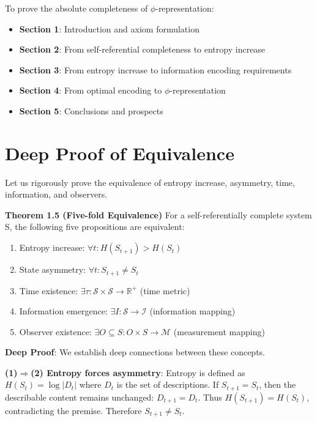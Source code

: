 To prove the absolute completeness of $\phi$-representation:

\begin{itemize}
\item \textbf{Section 1}: Introduction and axiom formulation
\item \textbf{Section 2}: From self-referential completeness to entropy increase
\item \textbf{Section 3}: From entropy increase to information encoding requirements
\item \textbf{Section 4}: From optimal encoding to $\phi$-representation
\item \textbf{Section 5}: Conclusions and prospects
\end{itemize}

\section{Deep Proof of Equivalence}
\label{sec:ch01_axiom_and_derivation:deep-proof-of-equivalence}

Let us rigorously prove the equivalence of entropy increase, asymmetry, time, information, and observers.

\textbf{Theorem 1.5 (Five-fold Equivalence)}
\label{thm:1.5}
For a self-referentially complete system S, the following five propositions are equivalent:
\begin{enumerate}
\item Entropy increase: $\forall t: H(S_{t+1}) > H(S_t)$
\item State asymmetry: $\forall t: S_{t+1} \neq S_t$  
\item Time existence: $\exists \tau: \mathcal{S} \times \mathcal{S} \to \mathbb{R}^+$ (time metric)
\item Information emergence: $\exists I: \mathcal{S} \to \mathcal{I}$ (information mapping)
\item Observer existence: $\exists O \subseteq S: O \times S \to \mathcal{M}$ (measurement mapping)
\end{enumerate}

\textbf{Deep Proof}: We establish deep connections between these concepts.

\textbf{(1)$\Rightarrow$(2) Entropy forces asymmetry}:
Entropy is defined as $H(S_t) = \log |D_t|$ where $D_t$ is the set of descriptions.
If $S_{t+1} = S_t$, then the describable content remains unchanged: $D_{t+1} = D_t$.
Thus $H(S_{t+1}) = H(S_t)$, contradicting the premise.
Therefore $S_{t+1} \neq S_t$.

